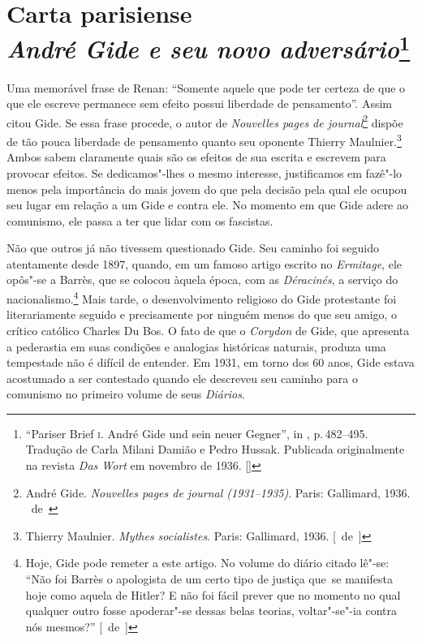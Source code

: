 \chapter{Carta parisiense \\ \emph{André Gide e seu novo adversário}\footnote[*]{``Pariser Brief \textsc{i}. André Gide und sein neuer Gegner'', in
  , p.\,482--495. Tradução de Carla Milani Damião e Pedro Hussak. Publicada originalmente na revista \emph{Das Wort} em novembro de 1936. []}}


Uma memorável frase de Renan: ``Somente aquele que pode ter certeza de
que o que ele escreve permanece sem efeito possui liberdade de
pensamento''. Assim citou Gide. Se essa frase procede, o autor de
\emph{Nouvelles pages de journal}\footnote{André Gide.
  \emph{Nouvelles pages de journal (1931--1935)}. Paris: Gallimard, 1936. \versal{[N.}~de~\versal{W.B.]}}
dispõe de tão pouca liberdade de pensamento quanto seu oponente
Thierry Maulnier.\footnote{Thierry Maulnier. \emph{Mythes
  socialistes}. Paris: Gallimard, 1936. [~de~]} Ambos sabem claramente quais
são os efeitos de sua escrita e escrevem para provocar
efeitos. Se dedicamos"-lhes o mesmo interesse, justificamos em
fazê"-lo menos pela importância do mais jovem do que pela decisão pela
qual ele ocupou seu lugar em relação a um Gide e contra ele. No
momento em que Gide adere ao comunismo, ele passa a ter que lidar com
os fascistas.

Não que outros já não tivessem questionado Gide. Seu caminho foi seguido
atentamente desde 1897, quando, em um famoso artigo escrito no
\emph{Ermitage}, ele opôs"-se a Barrès, que se colocou àquela época, com
as \emph{Déracinés}, a serviço do nacionalismo.\footnote{Hoje, Gide
  pode remeter a este artigo. No volume do diário citado lê"-se: ``Não
  foi Barrès o apologista de um certo tipo de justiça que~se manifesta
  hoje como aquela de Hitler? E não foi fácil prever que no momento no
  qual qualquer outro fosse apoderar"-se dessas belas teorias,
  voltar"-se"-ia contra nós mesmos?'' [~de~]} Mais tarde, o desenvolvimento
religioso do Gide protestante foi literariamente seguido e
precisamente por ninguém menos do que seu amigo, o crítico católico
Charles Du Bos. O fato de que o \emph{Corydon} de Gide, que apresenta a pederastia
em suas condições e analogias históricas naturais, produza uma
tempestade não é difícil de entender. Em 1931, em torno dos 60 anos,
Gide estava acostumado a ser contestado quando ele descreveu seu caminho
para o comunismo no primeiro volume de seus \emph{Diários}.

